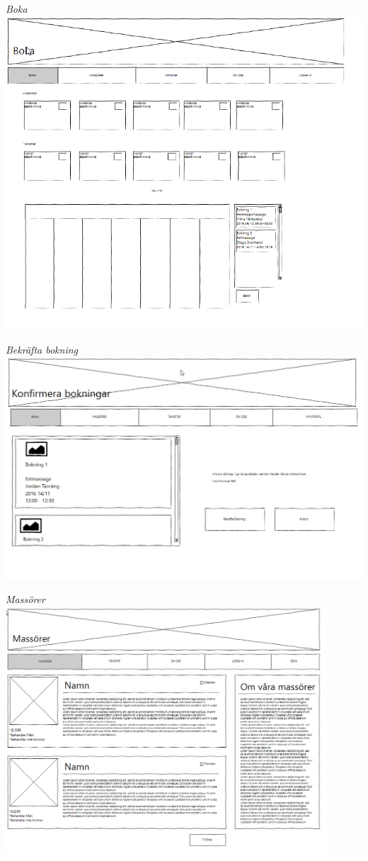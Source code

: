 \documentclass[11pt, titlepage, oneside, a4paper]{article}	%
\begin{document}
\begin{center}
    \textit{Boka}
    \includegraphics[width=1\textwidth]{../Bilder/Wireframe/boka}
    
    \textit{Bekräfta bokning}
    \includegraphics[width=1\textwidth]{../Bilder/Wireframe/bekrafta_bokning}
    \newpage
    
    \textit{Massörer}
    \includegraphics[width=0.9\textwidth]{../Bilder/Wireframe/massorer}
    

\end{center}
\end{document}
